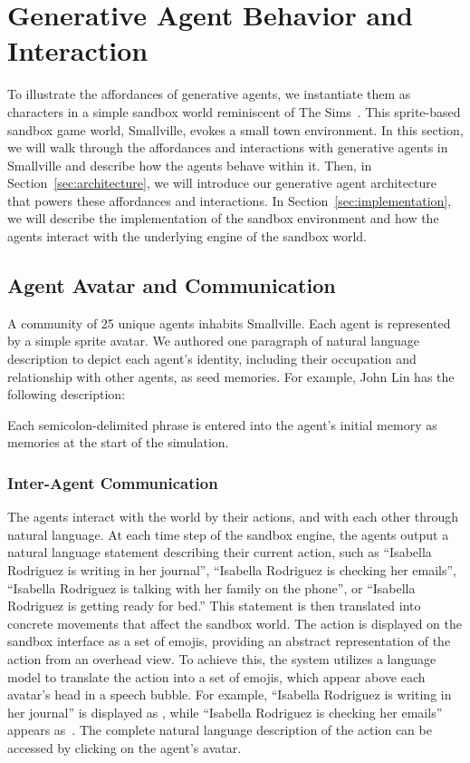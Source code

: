 \section{Generative Agent Behavior and Interaction}\label{sec:behavior}
To illustrate the affordances of generative agents, we instantiate them as characters in a simple sandbox world reminiscent of The Sims~\cite{49_ElectronicArts2009Sims}. This sprite-based sandbox game world, Smallville, evokes a small town environment. In this section, we will walk through the affordances and interactions with generative agents in Smallville and describe how the agents behave within it. Then, in Section~\ref{sec:architecture}, we will introduce our generative agent architecture that powers these affordances and interactions. In Section~\ref{sec:implementation}, we will describe the implementation of the sandbox environment and how the agents interact with the underlying engine of the sandbox world.

\subsection{Agent Avatar and Communication}\label{sec:avatar}
A community of 25 unique agents inhabits Smallville. Each agent is represented by a simple sprite avatar. We authored one paragraph of natural language description to depict each agent's identity, including their occupation and relationship with other agents, as seed memories. For example, John Lin has the following description:

\begin{quote}

\end{quote}

Each semicolon-delimited phrase is entered into the agent's initial memory as memories at the start of the simulation. 

\subsubsection{Inter-Agent Communication} The agents interact with the world by their actions, and with each other through natural language. At each time step of the sandbox engine, the agents output a natural language statement describing their current action, such as ``Isabella Rodriguez is writing in her journal'', ``Isabella Rodriguez is checking her emails'', ``Isabella Rodriguez is talking with her family on the phone'', or ``Isabella Rodriguez is getting ready for bed.'' This statement is then translated into concrete movements that affect the sandbox world. The action is displayed on the sandbox interface as a set of emojis, providing an abstract representation of the action from an overhead view. To achieve this, the system utilizes a language model to translate the action into a set of emojis, which appear above each avatar's head in a speech bubble. For example, ``Isabella Rodriguez is writing in her journal'' is displayed as \raisebox{-0.1cm}{\protect}\raisebox{-0.1cm}{\protect}, while ``Isabella Rodriguez is checking her emails'' appears as \raisebox{-0.1cm}{\protect}\,\raisebox{-0.1cm}{\protect}. The complete natural language description of the action can be accessed by clicking on the agent's avatar.

